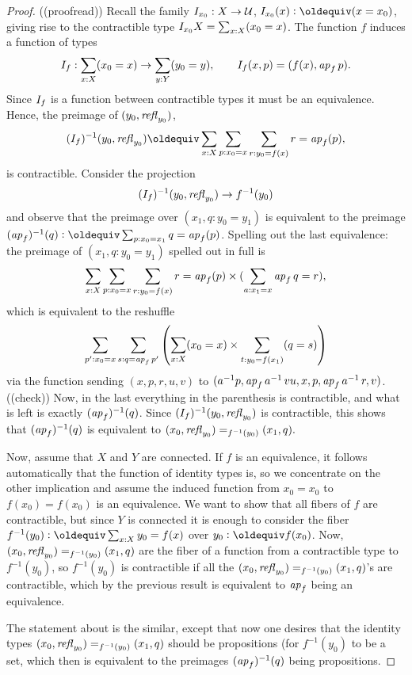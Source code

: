 {\begin{lemma}
\end{lemma}
\begin{proof}
((proofread))
  Recall the family ${I_{x_0}} : X\to\mathcal{U}$, $\uc{x_0}(x)\defequi (x=x_0)$, giving rise to the contractible type ${I_{x_0}}X=\sum_{x:X}(x_0=x)$.  The function $f$ induces a function of types 
$${I_{f}}:\sum_{x:X}(x_0=x)\to\sum_{y:Y}(y_0=y),\qquad {I_{f}}(x,p)=(f(x),\mathop{{\it ap}_{f}} p).$$  Since ${I_{f}}$ is a function between contractible types it must be an equivalence.  Hence, the preimage of $(y_0,\mathop{{\it refl}_{y_0}})$, 
$$(\uc{f})^{-1}(y_0,\refl{y_0})\oldequiv\sum_{x:X}\sum_{p:x_0=x}\sum_{r:y_0=f(x)}r=\ap f(p),$$  
is contractible.  
Consider the projection 
$$({I_{f}})^{-1}(y_0,\mathop{{\it refl}_{y_0}})\to f^{-1}(y_0)$$ and observe that the preimage over $(x_1,q:y_0=y_1) $ is equivalent to the preimage $(\ap f)^{-1}(q)\defequi\sum_{p:x_0=x_1}q=\ap f(p)$.  Spelling out the last equivalence: the preimage of $(x_1,q:y_0=y_1) $ spelled out in full is
$$\sum_{x:X}\sum_{p:x_0=x}\sum_{r:y_0=f(x)}r=\mathop{{\it ap}_{f}}(p)\times(\sum_{a:x_1=x}\mathop{{\it ap}_{f}} q=r),$$
which is equivalent to the reshuffle
$$\sum_{p':x_0=x}\sum_{s:q=\mathop{{\it ap}_{f}} p'}\left(\sum_{x:X}(x_0=x)\times\sum_{t:y_0=f(x_1)}(q=s)\right)$$
via the function sending $(x,p,r,u,v)$ to $(a^{-1}p,\mathop{{\it ap}_{f}} a^{-1}\,vu,x,p,\mathop{{\it ap}_{f}} a^{-1}\, r,v)$. ((check))  Now, in the last everything in the parenthesis is contractible, and what is left is exactly $(\mathop{{\it ap}_{f}})^{-1}(q)$.  Since $({I_{f}})^{-1}(y_0,\mathop{{\it refl}_{y_0}})$ is contractible, this shows that $(\mathop{{\it ap}_{f}})^{-1}(q)$ is equivalent to $(x_0,\mathop{{\it refl}_{y_0}})=_{f^{-1}(y_0)}(x_1,q).$

Now, assume that $X$ and $Y$ are connected.   If $f$ is an equivalence, it follows automatically that the function of identity types is, so we concentrate on the other implication and assume the induced function from $x_0=x_0$ to $f(x_0)=f(x_0)$ is an equivalence.  We want to show that all fibers of $f$ are contractible, but since $Y$ is connected it is enough to consider the fiber $f^{-1}(y_0)\defequi\sum_{x:X}y_0=f(x)$ over $y_0\defequi f(x_0)$.  Now, $(x_0,\mathop{{\it refl}_{y_0}})=_{f^{-1}(y_0)}(x_1,q)$ are the fiber of a function from a contractible type to $f^{-1}(y_0)$, so $f^{-1}(y_0)$ is contractible if all the $(x_0,\mathop{{\it refl}_{y_0}})=_{f^{-1}(y_0)}(x_1,q)$'s are contractible, which by the previous result is equivalent to $\mathop{{\it ap}_{f}}$ being an equivalence.  

The statement about \coverings is the similar, except that now one desires that the identity types $(x_0,\mathop{{\it refl}_{y_0}})=_{f^{-1}(y_0)}(x_1,q)$ should be propositions (for $f^{-1}(y_0)$ to be a set, which then is equivalent to the preimages $(\mathop{{\it ap}_{f}})^{-1}(q)$ being propositions.
\end{proof}

}
